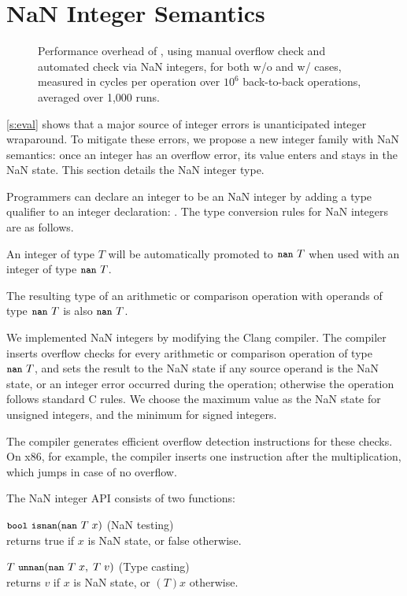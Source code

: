 \section{NaN Integer Semantics}
\label{s:miti}

\begin{figure}
\small
\centering

\caption{Performance overhead of ,
using manual overflow check  and
automated check via NaN integers, for both w/o and w/ 
cases, measured in cycles per operation over $10^6$ back-to-back
operations, averaged over 1,000 runs.}
\label{f:data:nan-micro}
\end{figure}

\autoref{s:eval} shows that a major source of integer errors is unanticipated
integer wraparound.  To mitigate these errors, we propose a new integer family
with NaN semantics: once an integer has an overflow error, its value enters and
stays in the NaN state. This section details the NaN integer type.

Programmers can declare an integer to be an NaN integer by adding a type
qualifier  to an integer declaration: . The type conversion
rules for NaN integers are as follows.
\begin{CompactItemize}
\item
An integer of type $T$ will be automatically promoted to $\cc{nan}\ T$
when used with an integer of type $\cc{nan}\ T$.
\item
The resulting type of an arithmetic or comparison operation with
operands of type $\cc{nan}\ T$ is also $\cc{nan}\ T$.
\end{CompactItemize}

We implemented NaN integers by modifying the Clang compiler.
The compiler inserts overflow checks for every arithmetic or
comparison operation of type $\cc{nan}\ T$, and sets the result to the
NaN state if any source operand is the NaN state, or an integer error occurred
during the operation; otherwise the operation follows standard C rules.
We choose the maximum value as the NaN state for unsigned integers,
and the minimum for signed integers.

The compiler generates efficient overflow detection instructions
for these checks. On x86, for example,
the compiler inserts one  instruction after the 
multiplication, which jumps in case of no overflow.

The NaN integer API consists of two functions:
\begin{CompactItemize}
\item
$\cc{bool}\ \cc{isnan}(\cc{nan}\ T\; x)$ \hfill (NaN testing) \\
returns true if $x$ is NaN state, or false otherwise.
\item
$T\ \cc{unnan}(\cc{nan}\ T\; x,\; T\; v)$ \hfill (Type casting) \\
returns $v$ if $x$ is NaN state, or $(T)x$ otherwise.
\end{CompactItemize}

